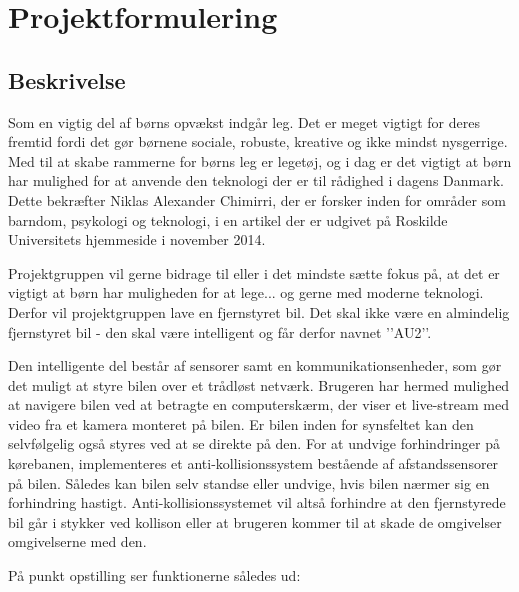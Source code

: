 \chapter{Projektformulering} \label{ch:projektformulering}


\section{Beskrivelse} \label{sec:beskrivelse}
Som en vigtig del af børns opvækst indgår leg. Det er meget vigtigt for deres fremtid fordi det gør børnene sociale, robuste, kreative og ikke mindst nysgerrige. Med til at skabe rammerne for børns leg er legetøj, og i dag er det vigtigt at børn har mulighed for at anvende den teknologi der er til rådighed i dagens Danmark. Dette bekræfter Niklas Alexander Chimirri, der er forsker inden for områder som barndom, psykologi og teknologi, i en artikel der er udgivet på Roskilde Universitets hjemmeside i november 2014. 

Projektgruppen vil gerne bidrage til eller i det mindste sætte fokus på, at det er vigtigt at børn har muligheden for at lege... og gerne med moderne teknologi. Derfor vil projektgruppen lave en fjernstyret bil. Det skal ikke være en almindelig fjernstyret bil - den skal være intelligent og får derfor navnet ’’AU2’’.

Den intelligente del består af sensorer samt en kommunikationsenheder, som gør det muligt at styre bilen over et trådløst netværk. Brugeren har hermed mulighed at navigere bilen ved at betragte en computerskærm, der viser et live-stream med video fra et kamera monteret på bilen. Er bilen inden for synsfeltet kan den selvfølgelig også styres ved at se direkte på den. For at undvige forhindringer på kørebanen, implementeres et anti-kollisionssystem bestående af afstandssensorer på bilen. Således kan bilen selv standse eller undvige, hvis bilen nærmer sig en forhindring hastigt. Anti-kollisionssystemet vil altså forhindre at den fjernstyrede bil går i stykker ved kollison eller at brugeren kommer til at skade de omgivelser omgivelserne med den.

På punkt opstilling ser funktionerne således ud:

